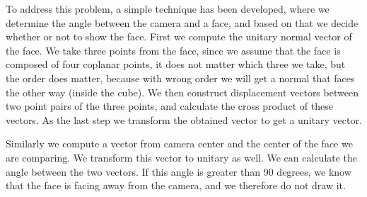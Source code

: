 To address this problem, a simple technique has been developed, where we determine the angle between the camera and a face, and based on that we decide whether or not to show the face. First we compute the unitary normal vector of the face. We take three points from the face, since we assume that the face is composed of four coplanar points, it does not matter which three we take, but the order does matter, because with wrong order we will get a normal that faces the other way (inside the cube). We then construct displacement vectors between two point pairs of the three points, and calculate the cross product of these vectors. As the last step we transform the obtained vector to get a unitary vector. 

Similarly we compute a vector from camera center and the center of the face we are comparing. We transform this vector to unitary as well. We can calculate the angle between the two vectors. If this angle is greater than 90 degrees, we know that the face is facing away from the camera, and we therefore do not draw it.

